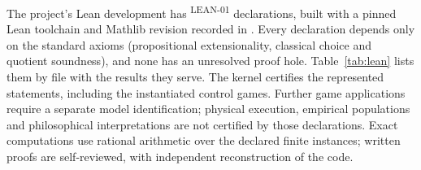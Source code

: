 \documentclass[pdflatex,sn-basic]{sn-jnl}%
\newcommand{\slot}[1]{}%
\newcommand{\rec}[1]{\ifannotated\textsuperscript{\textcolor{blue!60!black}{\tiny#1}}\fi}
\begin{document}
\begin{appendices}
\slot{B}
The project's Lean development has \numLeanDecls\rec{LEAN-01} declarations, built with a pinned Lean toolchain and Mathlib revision recorded in . Every declaration depends only on the standard axioms (propositional extensionality, classical choice and quotient soundness), and none has an unresolved proof hole. Table~\ref{tab:lean} lists them by file with the results they serve. The kernel certifies the represented statements, including the instantiated control games. Further game applications require a separate model identification; physical execution, empirical populations and philosophical interpretations are not certified by those declarations. Exact computations use rational arithmetic over the declared finite instances; written proofs are self-reviewed, with independent reconstruction of the code.


\end{appendices}
\end{document}
